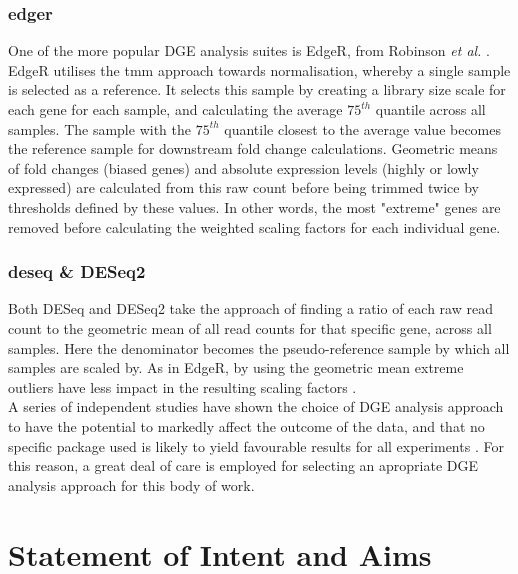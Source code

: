 \subsubsection{\acrfull{edger}}
One of the more popular DGE analysis suites is EdgeR, from Robinson \textit{et al.} \cite{Robinson2010}. EdgeR utilises the \acrfull{tmm} approach towards normalisation, whereby a single sample is selected as a reference. It selects this sample by creating a library size scale for each gene for each sample, and calculating the average $75^{th}$ quantile across all samples. The sample with the $75^{th}$ quantile closest to the average value becomes the reference sample for downstream fold change calculations. Geometric means of fold changes (biased genes) and absolute expression levels (highly or lowly expressed) are calculated from this raw count before being trimmed twice by thresholds defined by these values. In other words, the most "extreme" genes are removed before calculating the weighted scaling factors for each individual gene. 

\subsubsection{\acrfull{deseq} \& DESeq2}
Both DESeq and DESeq2 take the approach of finding a ratio of each raw read count to the geometric mean of all read counts for that specific gene, across all samples. Here the denominator becomes the pseudo-reference sample by which all samples are scaled by. As in EdgeR, by using the geometric mean extreme outliers have less impact in the resulting scaling factors \cite{Anders2010,Love2014}. \\

A series of independent studies have shown the choice of DGE analysis approach to have the potential to markedly affect the outcome of the data, and that no specific package used is likely to yield favourable results for all experiments \cite{Soneson2013,Rapaport2013, Seyednasrollah2015}. For this reason, a great deal of care is employed for selecting an apropriate DGE analysis approach for this body of work.

\section{Statement of Intent and Aims}

